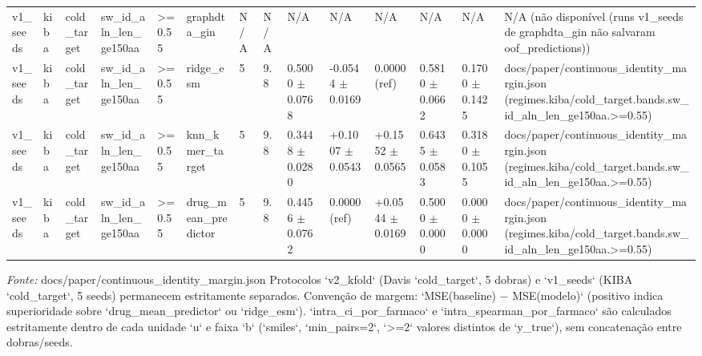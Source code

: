 \begin{table}[htbp]
\begin{tabular}{llllllllllllll}
v1\_seeds & kiba & cold\_target & sw\_id\_aln\_len\_ge150aa & >=0.55 & graphdta\_gin & N/A & N/A & N/A & N/A & N/A & N/A & N/A & N/A (não disponível (runs v1\_seeds de graphdta\_gin não salvaram oof\_predictions)) \\
v1\_seeds & kiba & cold\_target & sw\_id\_aln\_len\_ge150aa & >=0.55 & ridge\_esm & 5 & 9.8 & 0.5000 $\pm$ 0.0768 & -0.0544 $\pm$ 0.0169 & 0.0000 (ref) & 0.5810 $\pm$ 0.0662 & 0.1700 $\pm$ 0.1425 & docs/paper/continuous\_identity\_margin.json (regimes.kiba/cold\_target.bands.sw\_id\_aln\_len\_ge150aa.>=0.55) \\
v1\_seeds & kiba & cold\_target & sw\_id\_aln\_len\_ge150aa & >=0.55 & knn\_kmer\_target & 5 & 9.8 & 0.3448 $\pm$ 0.0280 & +0.1007 $\pm$ 0.0543 & +0.1552 $\pm$ 0.0565 & 0.6435 $\pm$ 0.0583 & 0.3180 $\pm$ 0.1055 & docs/paper/continuous\_identity\_margin.json (regimes.kiba/cold\_target.bands.sw\_id\_aln\_len\_ge150aa.>=0.55) \\
v1\_seeds & kiba & cold\_target & sw\_id\_aln\_len\_ge150aa & >=0.55 & drug\_mean\_predictor & 5 & 9.8 & 0.4456 $\pm$ 0.0762 & 0.0000 (ref) & +0.0544 $\pm$ 0.0169 & 0.5000 $\pm$ 0.0000 & 0.0000 $\pm$ 0.0000 & docs/paper/continuous\_identity\_margin.json (regimes.kiba/cold\_target.bands.sw\_id\_aln\_len\_ge150aa.>=0.55) \\
\bottomrule
\end{tabular}
\begin{flushleft}
\footnotesize \textit{Fonte:} docs/paper/continuous\_identity\_margin.json Protocolos `v2\_kfold` (Davis `cold\_target`, 5 dobras) e `v1\_seeds` (KIBA `cold\_target`, 5 seeds) permanecem estritamente separados. Convenção de margem: `MSE(baseline) − MSE(modelo)` (positivo indica superioridade sobre `drug\_mean\_predictor` ou `ridge\_esm`). `intra\_ci\_por\_farmaco` e `intra\_spearman\_por\_farmaco` são calculados estritamente dentro de cada unidade `u` e faixa `b` (`smiles`, `min\_pairs=2`, `>=2` valores distintos de `y\_true`), sem concatenação entre dobras/seeds.
\end{flushleft}
\end{table}
